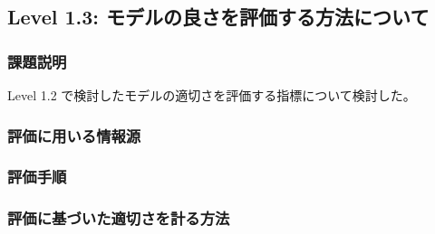 \subsection{Level 1.3: モデルの良さを評価する方法について}
\subsubsection{課題説明}
Level 1.2 で検討したモデルの適切さを評価する指標について検討した。

\subsubsection{評価に用いる情報源}
\subsubsection{評価手順}
\subsubsection{評価に基づいた適切さを計る方法}

